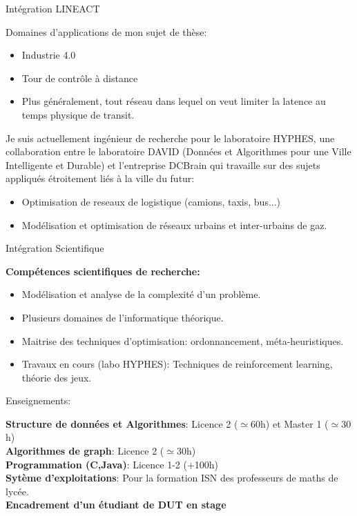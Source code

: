 \documentclass[10 pt]{beamer}
\begin{document}
\begin{frame}{Intégration LINEACT}

\begin{block}{Domaines d'applications de mon sujet de thèse:}

 \begin{itemize}
  \item Industrie 4.0
  \item Tour de contrôle à distance
  \item Plus généralement, tout réseau dans lequel on veut limiter la latence au temps physique de transit.
  \end{itemize}
\end{block}
\vspace{1cm}
Je suis actuellement ingénieur de recherche pour le laboratoire HYPHES, une collaboration entre le laboratoire DAVID (Données et Algorithmes pour une Ville Intelligente et Durable) et l'entreprise DCBrain qui travaille sur des sujets appliqués étroitement liés à la ville du futur: 
 \begin{itemize}
  \item Optimisation de reseaux de logistique (camions, taxis, bus...)
  \item Modélisation et optimisation de réseaux urbains et inter-urbains de gaz.
  \end{itemize}


  
\end{frame}

\begin{frame}{Intégration Scientifique}

\textbf{Compétences scientifiques de recherche:}
\begin{itemize}
  \item Modélisation et analyse de la complexité d'un problème.
  \item Plusieurs domaines de l'informatique théorique.
  \item Maitrise des techniques d'optimisation: ordonnancement, méta-heuristiques.
  \item Travaux en cours (labo HYPHES): Techniques de reinforcement learning, théorie des jeux.
  \end{itemize}



  
\end{frame}

\begin{frame}{Enseignements:}
  
    \textbf{Structure de données et Algorithmes}: Licence 2 ($\simeq60$h) et Master 1 ($\simeq30$h)\\
    \textbf{Algorithmes de graph}: Licence 2 ($\simeq30$h)\\
    \textbf{Programmation (C,Java)}: Licence 1-2 (+100h)\\
    \textbf{Sytème d'exploitations}: Pour la formation ISN des professeurs de maths de lycée.\\
    \textbf{Encadrement d'un étudiant de DUT en stage}

\end{frame}
\end{document}
